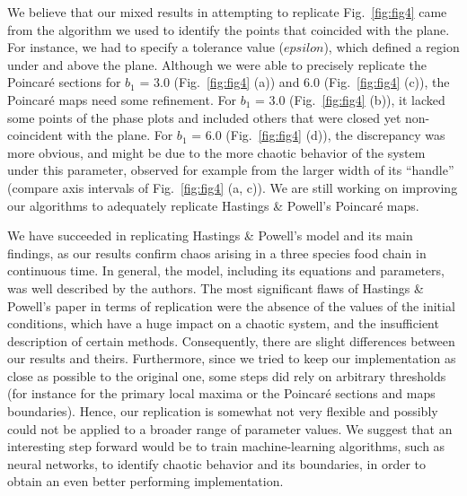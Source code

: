 \documentclass[
]{article}
\begin{document}
We believe that our mixed results in attempting to replicate
Fig.~\ref{fig:fig4} came from the algorithm we used to identify the
points that coincided with the plane. For instance, we had to specify a
tolerance value (\(epsilon\)), which defined a region under and above
the plane. Although we were able to precisely replicate the Poincaré
sections for \(b_1\) = 3.0 (Fig.~\ref{fig:fig4} (a)) and 6.0
(Fig.~\ref{fig:fig4} (c)), the Poincaré maps need some refinement. For
\(b_1\) = 3.0 (Fig.~\ref{fig:fig4} (b)), it lacked some points of the
phase plots and included others that were closed yet non-coincident with
the plane. For \(b_1\) = 6.0 (Fig.~\ref{fig:fig4} (d)), the discrepancy
was more obvious, and might be due to the more chaotic behavior of the
system under this parameter, observed for example from the larger width
of its ``handle'' (compare axis intervals of Fig.~\ref{fig:fig4} (a,
c)). We are still working on improving our algorithms to adequately
replicate Hastings \& Powell's Poincaré maps.

We have succeeded in replicating Hastings \& Powell's model and its main
findings, as our results confirm chaos arising in a three species food
chain in continuous time. In general, the model, including its equations
and parameters, was well described by the authors. The most significant
flaws of Hastings \& Powell's paper in terms of replication were the
absence of the values of the initial conditions, which have a huge
impact on a chaotic system, and the insufficient description of certain
methods. Consequently, there are slight differences between our results
and theirs. Furthermore, since we tried to keep our implementation as
close as possible to the original one, some steps did rely on arbitrary
thresholds (for instance for the primary local maxima or the Poincaré
sections and maps boundaries). Hence, our replication is somewhat not
very flexible and possibly could not be applied to a broader range of
parameter values. We suggest that an interesting step forward would be
to train machine-learning algorithms, such as neural networks, to
identify chaotic behavior and its boundaries, in order to obtain an even
better performing implementation.
\end{document}

